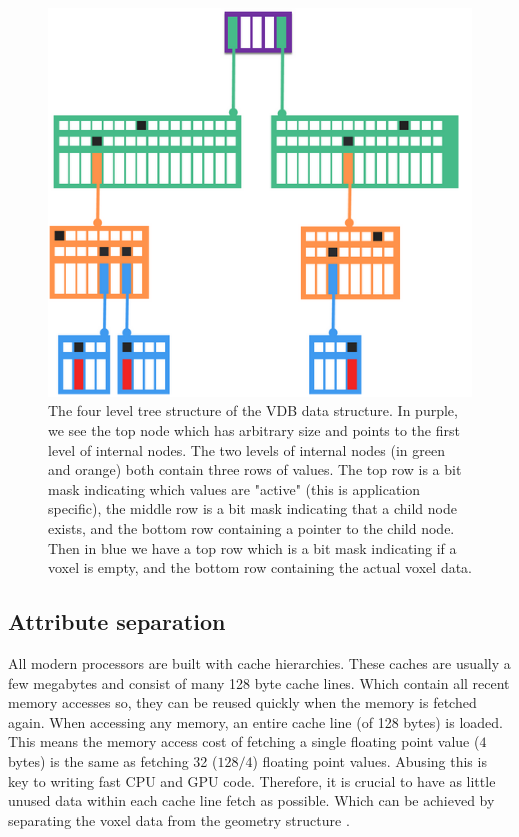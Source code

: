 \begin{figure}
    \centering
    \includegraphics[width=\linewidth]{figures/OpenVDB.png}
    \caption{The four level tree structure of the VDB data structure. In purple, we see the top node which has arbitrary size and points to the first level of internal nodes. The two levels of internal nodes (in green and orange) both contain three rows of values. The top row is a bit mask indicating which values are "active" (this is application specific), the middle row is a bit mask indicating that a child node exists, and the bottom row containing a pointer to the child node. Then in blue we have a top row which is a bit mask indicating if a voxel is empty, and the bottom row containing the actual voxel data. \cite{museth2013vdb}}
    \label{fig:VDB}
\end{figure}




\subsection{Attribute separation} \label{related_work:attribute_separation}
All modern processors are built with cache hierarchies. These caches are usually a few megabytes and consist of many 128 byte cache lines. Which contain all recent memory accesses so, they can be reused quickly when the memory is fetched again. When accessing any memory, an entire cache line (of 128 bytes) is loaded. This means the memory access cost of fetching a single floating point value ($4$ bytes) is the same as fetching 32 ($128/4$) floating point values. Abusing this is key to writing fast CPU and GPU code. Therefore, it is crucial to have as little unused data within each cache line fetch as possible. Which can be achieved by separating the voxel data from the geometry structure \cite{dado2016geometry}.
